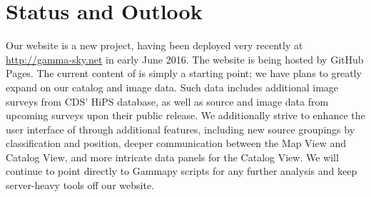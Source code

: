 \section{Status and Outlook}


Our website is a new project, having been deployed very recently at \url{http://gamma-sky.net} in early June 2016. The website is being hosted by GitHub Pages. The current content of \gammasky is simply a starting point; we have plans to greatly expand on our catalog and image data. Such data includes additional image surveys from CDS' HiPS database, as well as source and image data from upcoming surveys upon their public release. We additionally strive to enhance the user interface of \gammasky through additional features, including new source groupings by classification and position, deeper communication between the Map View and Catalog View, and more intricate data panels for the Catalog View. We will continue to point directly to Gammapy scripts for any further analysis and keep server-heavy tools off our website.
